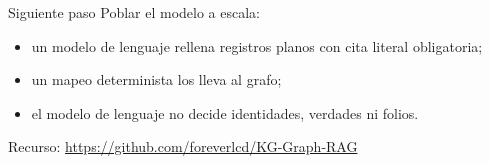 \documentclass[aspectratio=169,11pt]{beamer}
\begin{document}
\begin{frame}{Siguiente paso}
Poblar el modelo a escala:
\begin{itemize}
\item un modelo de lenguaje rellena \alert{registros planos} con cita literal obligatoria;
\item un mapeo determinista los lleva al grafo;
\item el modelo de lenguaje no decide identidades, verdades ni folios.
\end{itemize}
\medskip
Recurso: \url{https://github.com/foreverlcd/KG-Graph-RAG}
\end{frame}
\end{document}
